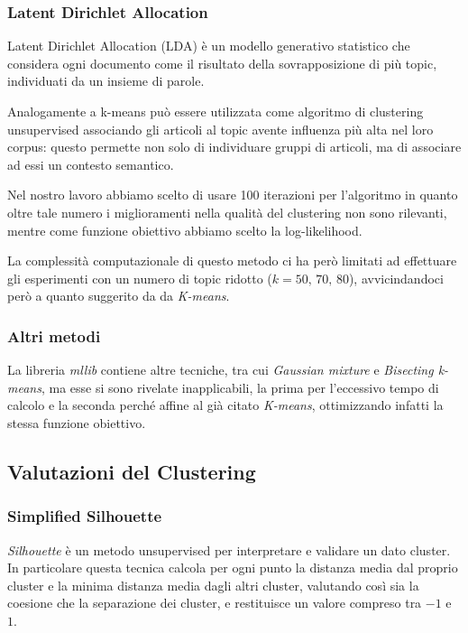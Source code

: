 \documentclass[
	11pt, %
	a4paper, %
	oneside, %
	headinclude,footinclude, %
	BCOR5mm, %
]{scrartcl}
\begin{document}
		\subsubsection{Latent Dirichlet Allocation}

			Latent Dirichlet Allocation (LDA)\cite{lda} è un modello generativo statistico che considera ogni documento come il risultato della sovrapposizione di più topic, individuati da un insieme di parole.
			
			Analogamente a k-means può essere utilizzata come algoritmo di clustering unsupervised associando gli articoli al topic avente influenza più alta nel loro corpus: questo permette non solo di individuare gruppi di articoli, ma di associare ad essi un contesto semantico.
			
			
			Nel nostro lavoro abbiamo scelto di usare 100 iterazioni per l'algoritmo in quanto oltre tale numero i miglioramenti nella qualità del clustering non sono rilevanti\cite{ldaiterations}, mentre come funzione obiettivo abbiamo scelto la log-likelihood\cite{ldaevaluation}.
			
			La complessità computazionale di questo metodo ci ha però limitati ad effettuare gli esperimenti con un numero di topic ridotto ($k=50,\,70,\,80$), avvicindandoci però a quanto suggerito da da \emph{K-means}.
		
		\subsubsection{Altri metodi}
			La libreria \emph{mllib} contiene altre tecniche, tra cui \emph{Gaussian mixture} e \emph{Bisecting k-means}, ma esse si sono rivelate inapplicabili, la prima per l'eccessivo tempo di calcolo e la seconda perché affine al già citato \emph{K-means}, ottimizzando infatti la stessa funzione obiettivo.


	\subsection{Valutazioni del Clustering}

		\subsubsection{Simplified Silhouette}
			\emph{Silhouette} è un metodo unsupervised per interpretare e validare un dato cluster.
			In particolare questa tecnica calcola per ogni punto la distanza media dal proprio cluster e la minima distanza media dagli altri cluster, valutando così sia la coesione che la separazione dei cluster, e restituisce un valore compreso tra $-1$ e $1$.
			
\end{document}
